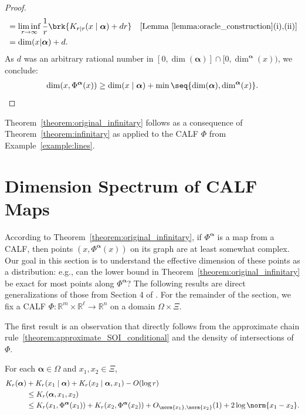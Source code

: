 \begin{proof}
\begin{align*}
            &= \liminf_{r \to \infty} \frac{1}{r} \brk{K_{r \mid r}(x \mid \boldsymbol{\alpha}) + dr} & [\text{Lemma~\ref{lemma:oracle_construction}(i),(ii)}]\\
            &= \dim(x | \boldsymbol{\alpha}) + d.
    \end{align*}
    As $d$ was an arbitrary rational number in $[0, \dim(\boldsymbol{\alpha})] \cap [0, \dim^{\boldsymbol{\alpha}}(x))$, we conclude:
    \begin{align*}
        \dim(x, \Phi^{\boldsymbol{\alpha}}(x)) \geq \dim(x \mid \boldsymbol{\alpha}) + \min \seq{\dim(\boldsymbol{\alpha}), \dim^{\boldsymbol{\alpha}}(x)}.
    \end{align*}
\end{proof}

Theorem~\ref{theorem:original_infinitary} follows as a consequence of Theorem~\ref{theorem:infinitary} as applied to the CALF $\Phi$ from Example~\ref{example:lines}.

\section{Dimension Spectrum of CALF Maps}

According to Theorem~\ref{theorem:original_infinitary}, if $\Phi^{\boldsymbol{\alpha}}$ is a map from a CALF, then points $(x, \Phi^{\boldsymbol{\alpha}}(x))$ on its graph are at least somewhat complex. Our goal in this section is to understand the effective dimension of these points as a distribution: e.g., can the lower bound in Theorem~\ref{theorem:original_infinitary} be exact for most points along $\Phi^{\boldsymbol{\alpha}}$? The following results are direct generalizations of those from Section 4 of \cite{Stu18}. For the remainder of the section, we fix a CALF $\Phi: \mathbb{R}^m \times \mathbb{R}^\ell \to \mathbb{R}^n$ on a domain $\Omega \times \Xi$.

The first result is an observation that directly follows from the approximate chain rule~\ref{theorem:approximate_SOI_conditional} and the density of intersections of $\Phi$. 
\begin{observation}
    \label{observation:computing_alpha_x_x'}
    For each $\boldsymbol{\alpha} \in \Omega$ and $x_1, x_2 \in \Xi$,
    \begin{align*}
        K_r(\boldsymbol{\alpha}) &+ K_r(x_1 \mid \boldsymbol{\alpha}) + K_r(x_2 \mid \boldsymbol{\alpha}, x_1) - O(\log r) \\&\leq K_r(\boldsymbol{\alpha}, x_1, x_2) \\
        &\leq K_r(x_1, \Phi^{\boldsymbol{\alpha}}(x_1)) + K_r(x_2, \Phi^{\boldsymbol{\alpha}}(x_2)) + O_{\norm{x_1}, \norm{x_2}}(1) + 2 \log \norm{x_1 - x_2}.
    \end{align*}
\end{observation}

